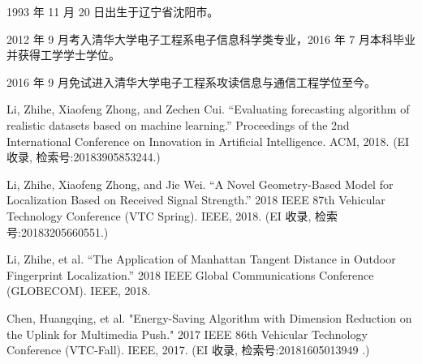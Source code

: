 \begin{resume}


  1993 年 11 月 20 日出生于辽宁省沈阳市。

  2012 年 9 月考入清华大学电子工程系电子信息科学类专业，2016 年 7 月本科毕业并获得工学学士学位。

  2016 年 9 月免试进入清华大学电子工程系攻读信息与通信工程学位至今。


  \begin{publications}
    \item Li, Zhihe, Xiaofeng Zhong, and Zechen Cui. “Evaluating forecasting algorithm of realistic datasets based on machine learning.” Proceedings of the 2nd International Conference on Innovation in Artificial Intelligence. ACM, 2018. (EI 收录, 检索号:20183905853244.)
    \item Li, Zhihe, Xiaofeng Zhong, and Jie Wei. “A Novel Geometry-Based Model for Localization Based on Received Signal Strength.” 2018 IEEE 87th Vehicular Technology Conference (VTC Spring). IEEE, 2018. (EI 收录, 检索号:20183205660551.)
    \item Li, Zhihe, et al. “The Application of Manhattan Tangent Distance in Outdoor Fingerprint Localization.” 2018 IEEE Global Communications Conference (GLOBECOM). IEEE, 2018. 
  \end{publications}

    

  \begin{publications}
    \item Chen, Huangqing, et al. "Energy-Saving Algorithm with Dimension Reduction on the Uplink for Multimedia Push." 2017 IEEE 86th Vehicular Technology Conference (VTC-Fall). IEEE, 2017. (EI 收录, 检索号:20181605013949 .)
  \end{publications}

    

\end{resume}
